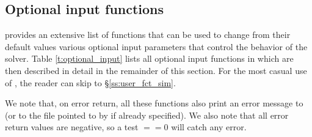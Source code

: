 
\subsection{Optional input functions}\label{ss:optional_input}

{\cvodes} provides an extensive list of functions that can be used to change
from their default values various optional input parameters that control the
behavior of the {\cvodes} solver. 
Table \ref{t:optional_input} lists all optional input functions in {\cvodes} which 
are then described in detail in the remainder of this section.
For the most casual use of {\cvodes}, the reader can skip to \S\ref{ss:user_fct_sim}.

We note that, on error return, all these functions also print an error message to  
(or to the file pointed to by  if already specified).
We also note that all error return values are negative, so a test $==0$
will catch any error.

